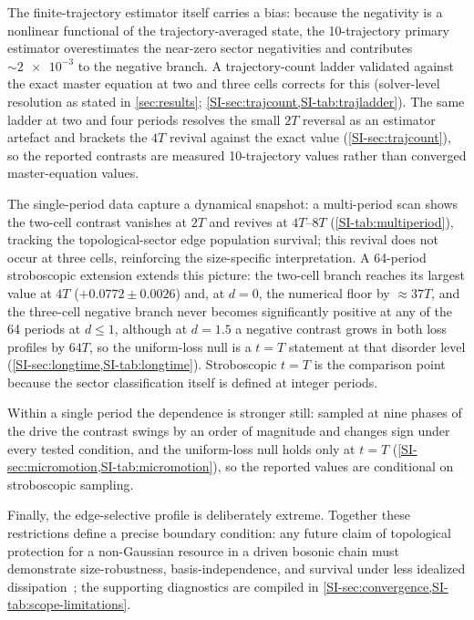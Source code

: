 \documentclass[aps,pra,preprint,superscriptaddress,amsmath,amssymb]{revtex4-2}
\begin{document}
The finite-trajectory estimator itself carries a bias: because the negativity is a nonlinear functional of the trajectory-averaged state, the \num{10}-trajectory primary estimator overestimates the near-zero sector negativities and contributes $\sim\num{2e-3}$ to the negative branch. A trajectory-count ladder validated against the exact master equation at two and three cells corrects for this (solver-level resolution as stated in \cref{sec:results}; \cref{SI-sec:trajcount,SI-tab:trajladder}). The same ladder at two and four periods resolves the small $2T$ reversal as an estimator artefact and brackets the $4T$ revival against the exact value (\cref{SI-sec:trajcount}), so the reported contrasts are measured \num{10}-trajectory values rather than converged master-equation values.

The single-period data capture a dynamical snapshot: a multi-period scan shows the two-cell contrast vanishes at $2T$ and revives at $4T$--$8T$ (\cref{SI-tab:multiperiod}), tracking the topological-sector edge population survival; this revival does not occur at three cells, reinforcing the size-specific interpretation. A \num{64}-period stroboscopic extension extends this picture: the two-cell branch reaches its largest value at $4T$ ($+\num{0.0772}\pm\num{0.0026}$) and, at $d=\num{0}$, the numerical floor by ${\approx}\num{37}T$, and the three-cell negative branch never becomes significantly positive at any of the \num{64} periods at $d\le\num{1}$, although at $d=\num{1.5}$ a negative contrast grows in both loss profiles by $64T$, so the uniform-loss null is a $t=T$ statement at that disorder level (\cref{SI-sec:longtime,SI-tab:longtime}). Stroboscopic $t=T$ is the comparison point because the sector classification itself is defined at integer periods.

Within a single period the dependence is stronger still: sampled at nine phases of the drive the contrast swings by an order of magnitude and changes sign under every tested condition, and the uniform-loss null holds only at $t=T$ (\cref{SI-sec:micromotion,SI-tab:micromotion}), so the reported values are conditional on stroboscopic sampling.

Finally, the edge-selective profile is deliberately extreme. Together these restrictions define a precise boundary condition: any future claim of topological protection for a non-Gaussian resource in a driven bosonic chain must demonstrate size-robustness, basis-independence, and survival under less idealized dissipation~\cite{Sieberer2025}; the supporting diagnostics are compiled in \cref{SI-sec:convergence,SI-tab:scope-limitations}.
\end{document}
